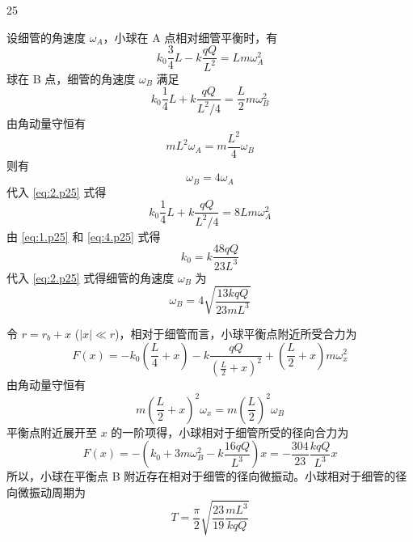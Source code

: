 \begin{solution}{25}
  \begin{subsolution}
    设细管的角速度 $\omega_{A}$，小球在 A 点相对细管平衡时，有
    \begin{equation}
      k_{0} \frac{3}{4} L - k \frac{q Q}{L^{2}} = L m \omega_{A}^{2}
      \label{eq:1.p25}
    \end{equation}
    球在 B 点，细管的角速度 $\omega_{B}$ 满足
    \begin{equation}
      k_{0} \frac{1}{4} L + k \frac{q Q}{L^{2} / 4} = \frac{L}{2} m \omega_{B}^{2}
      \label{eq:2.p25}
    \end{equation}
    由角动量守恒有
    \begin{equation}
      m L^{2} \omega_{A} = m \frac{L^{2}}{4} \omega_{B}
      \label{eq:3.p25}
    \end{equation}
    则有
    \begin{equation}
      \omega_{B} = 4 \omega_{A}
    \end{equation}
    代入 \eqref{eq:2.p25} 式得
    \begin{equation}
      k_{0} \frac{1}{4} L + k \frac{q Q}{L^{2} / 4} = 8 L m \omega_{A}^{2}
      \label{eq:4.p25}
    \end{equation}
    由 \eqref{eq:1.p25} 和 \eqref{eq:4.p25} 式得
    \begin{equation}
      k_{0} = k \frac{48 q Q}{23 L^{3}}
      \label{eq:5.p25}
    \end{equation}
    代入 \eqref{eq:2.p25} 式得细管的角速度 $\omega_{B}$ 为
    \begin{equation}
      \omega_{B} = 4 \sqrt{\frac{13 k q Q}{23 m L^{3}}}
      \label{eq:6.p25}
    \end{equation}
  \end{subsolution}
  \begin{subsolution}
    令 $r = r_{b} + x$ ($|x| \ll r$)，相对于细管而言，小球平衡点附近所受合力为
    \begin{equation}
      F(x) = - k_{0} \left(\frac{L}{4} + x\right) - k \frac{q Q}{\left(\frac{L}{2} + x\right)^{2}} + \left(\frac{L}{2} + x\right) m \omega_{x}^{2}
      \label{eq:7.p25}
    \end{equation}
    由角动量守恒有
    \begin{equation}
      m \left(\frac{L}{2} + x\right)^{2} \omega_{x} = m \left(\frac{L}{2}\right)^{2} \omega_{B}
      \label{eq:8.p25}
    \end{equation}
    平衡点附近展开至 $x$ 的一阶项得，小球相对于细管所受的径向合力为
    \begin{equation}
      F(x) = - \left(k_{0} + 3 m \omega_{B}^{2} - k \frac{16 q Q}{L^{3}}\right) x = - \frac{304}{23} \frac{k q Q}{L^{3}} x
      \label{eq:9.p25}
    \end{equation}
    所以，小球在平衡点 B 附近存在相对于细管的径向微振动。小球相对于细管的径向微振动周期为
    \begin{equation}
      T = \frac{\pi}{2} \sqrt{\frac{23}{19} \frac{m L^{3}}{k q Q}}
      \label{eq:10.p25}
    \end{equation}
  \end{subsolution}
\end{solution}